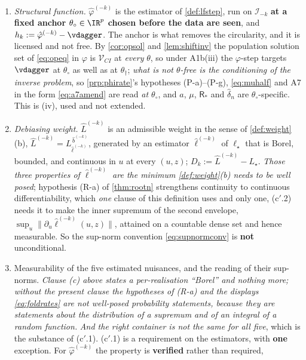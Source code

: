 \begin{definition}
\begin{enumerate}
\item[(b)] \emph{Structural function.} $\hat\varphi^{(-k)}$ is the estimator of \cref{def:lfstep}, run on
$\mathcal I_{-k}$ \textbf{at a fixed anchor $\theta_\circ\in\IR^{p}$ chosen before the data are seen}, and
$h_k:=\hat\varphi^{(-k)}-\vdagger$. The anchor is what removes the circularity, and it is licensed and
not free. By \cref{cor:opsol} and \cref{lem:shiftinv} the population solution set of \eqref{eq:opeq} in
$\varphi$ is $\mathcal V_{CI}$ at \emph{every} $\theta$, so under A1b(iii) the $\varphi$-step targets
$\vdagger$ at $\theta_\circ$ as well as at $\theta_\dagger$; \emph{what is not $\theta$-free is the
conditioning of the inverse problem}, so \cref{prp:phirate}'s hypotheses (P-a)--(P-g), \eqref{eq:muhalf} and
A7 in the form \eqref{eq:a7amend} are read \emph{at $\theta_\circ$}, and $a$, $\mu$, $\mathsf R_\ast$ and
$\hat\delta_n$ are $\theta_\circ$-specific. This is \textup{(iv)}, used and not extended.
\item[(c)] \emph{Debiasing weight.} $\hat L^{(-k)}$ is an admissible weight in the sense of
\cref{def:weight}(b), $\hat L^{(-k)}=L^{\,\hat b^{(-k)}}_{\hat\ell^{(-k)}}$, generated by an estimator
$\hat\ell^{(-k)}$ of $\ell_\star$ that is Borel, bounded, and continuous in $u$ at every $(u,z)$;
$D_k:=\hat L^{(-k)}-L_\star$. \emph{Those three properties of $\hat\ell^{(-k)}$ are the minimum
\cref{def:weight}(b) needs to be well posed}; hypothesis (R-a) of
\cref{thm:rootn} strengthens continuity to continuous differentiability, which \emph{one} clause of this
definition uses and only one, \textup{(c$'$.2)} needs it to make the inner supremum of the second
envelope, $\sup_u\|\partial_u\hat\ell^{(-k)}(u,z)\|$, attained on a countable dense set and hence
measurable. So the sup-norm convention \eqref{eq:supnormconv} is \textbf{not} unconditional.
\item[(c$'$)] Measurability of the five estimated nuisances, and the reading of their sup-norms.
\emph{Clause \textup{(c)} above states a per-realisation ``Borel'' and nothing more; without the present
clause the hypotheses of (R-a) and the displays \eqref{eq:foldrates} are not well-posed probability
statements, because they are statements about the distribution of a supremum and of an integral of a random
function.} \emph{And the right container is not the same for all five}, which is the substance of
\textup{(c$'$.1)}. \textup{(c$'$.1)} is a requirement on the estimators, with \textbf{one} exception. For $\hat\varphi^{(-k)}$ the property is \textbf{verified} rather than required,

\end{enumerate}
\end{definition}

